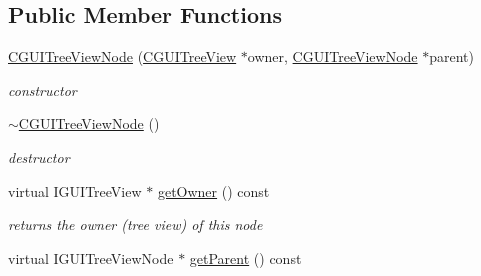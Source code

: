 \subsection*{Public Member Functions}
\begin{DoxyCompactItemize}
\item 
\hypertarget{classirr_1_1gui_1_1_c_g_u_i_tree_view_node_ad4b9061cb6b3213bd029deb375e2f527}{\hyperlink{classirr_1_1gui_1_1_c_g_u_i_tree_view_node_ad4b9061cb6b3213bd029deb375e2f527}{C\-G\-U\-I\-Tree\-View\-Node} (\hyperlink{classirr_1_1gui_1_1_c_g_u_i_tree_view}{C\-G\-U\-I\-Tree\-View} $\ast$owner, \hyperlink{classirr_1_1gui_1_1_c_g_u_i_tree_view_node}{C\-G\-U\-I\-Tree\-View\-Node} $\ast$parent)}\label{classirr_1_1gui_1_1_c_g_u_i_tree_view_node_ad4b9061cb6b3213bd029deb375e2f527}

\begin{DoxyCompactList}\small\item\em constructor \end{DoxyCompactList}\item 
\hypertarget{classirr_1_1gui_1_1_c_g_u_i_tree_view_node_a7357aeeece83f552bc48c23132beb483}{\hyperlink{classirr_1_1gui_1_1_c_g_u_i_tree_view_node_a7357aeeece83f552bc48c23132beb483}{$\sim$\-C\-G\-U\-I\-Tree\-View\-Node} ()}\label{classirr_1_1gui_1_1_c_g_u_i_tree_view_node_a7357aeeece83f552bc48c23132beb483}

\begin{DoxyCompactList}\small\item\em destructor \end{DoxyCompactList}\item 
\hypertarget{classirr_1_1gui_1_1_c_g_u_i_tree_view_node_a6e340a9ef79490c62c453f73c09bcb49}{virtual I\-G\-U\-I\-Tree\-View $\ast$ \hyperlink{classirr_1_1gui_1_1_c_g_u_i_tree_view_node_a6e340a9ef79490c62c453f73c09bcb49}{get\-Owner} () const }\label{classirr_1_1gui_1_1_c_g_u_i_tree_view_node_a6e340a9ef79490c62c453f73c09bcb49}

\begin{DoxyCompactList}\small\item\em returns the owner (tree view) of this node \end{DoxyCompactList}\item 
\hypertarget{classirr_1_1gui_1_1_c_g_u_i_tree_view_node_a8bf16abad45adff02e5a8414afe81ded}{virtual I\-G\-U\-I\-Tree\-View\-Node $\ast$ \hyperlink{classirr_1_1gui_1_1_c_g_u_i_tree_view_node_a8bf16abad45adff02e5a8414afe81ded}{get\-Parent} () const }\label{classirr_1_1gui_1_1_c_g_u_i_tree_view_node_a8bf16abad45adff02e5a8414afe81ded}


\end{DoxyCompactItemize}
